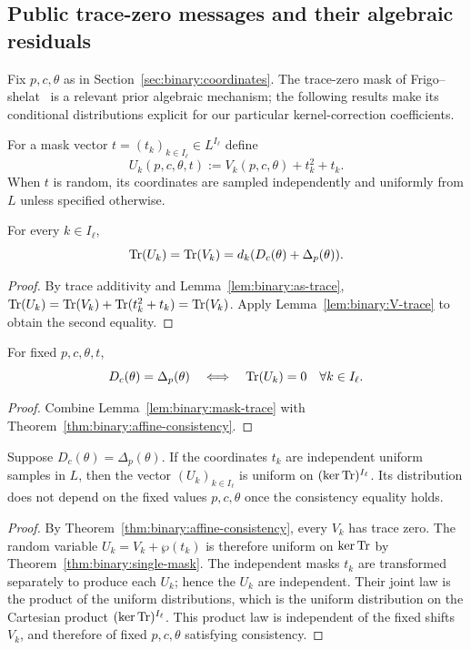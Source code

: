 \subsection{Public trace-zero messages and their algebraic residuals}\label{sec:binary:masked-traces}
Fix $p,c,\theta$ as in Section~\ref{sec:binary:coordinates}.
The trace-zero mask of Frigo--shelat~\cite{FrigoShelat2026}
is a relevant prior algebraic mechanism; the following results
make its conditional distributions explicit for our particular
kernel-correction coefficients.

\begin{definition}\label{def:binary:masked-values}
For a mask vector $t=(t_k)_{k\in I_\ell}\in L^{I_\ell}$
define
\[
 U_k(p,c,\theta,t)
   :=V_k(p,c,\theta)+t_k^2+t_k.
\]
When $t$ is random, its coordinates are sampled independently
and uniformly from $L$ unless specified otherwise.
\end{definition}

\begin{lemma}\label{lem:binary:mask-trace}
For every $k\in I_\ell$,
\[
 \operatorname{Tr}(U_k)=\operatorname{Tr}(V_k)
  =d_k(D_c(\theta)+\Delta_p(\theta)).
\]
\end{lemma}
\begin{proof}
By trace additivity and
Lemma~\ref{lem:binary:as-trace},
$\operatorname{Tr}(U_k)=\operatorname{Tr}(V_k)+\operatorname{Tr}(t_k^2+t_k)=\operatorname{Tr}(V_k)$.
Apply Lemma~\ref{lem:binary:V-trace} to obtain the
second equality.
\end{proof}

\begin{corollary}\label{cor:binary:masked-traces-consistent}
For fixed $p,c,\theta,t$,
\[
 D_c(\theta)=\Delta_p(\theta)
 \quad\Longleftrightarrow\quad
 \operatorname{Tr}(U_k)=0\quad\forall k\in I_\ell.
\]
\end{corollary}
\begin{proof}
Combine Lemma~\ref{lem:binary:mask-trace}
with Theorem~\ref{thm:binary:affine-consistency}.
\end{proof}

\begin{theorem}\label{thm:binary:masked-vector-uniform}
Suppose $D_c(\theta)=\Delta_p(\theta)$.
If the coordinates $t_k$ are independent uniform samples in $L$,
then the vector $(U_k)_{k\in I_\ell}$
is uniform on $(\ker\operatorname{Tr})^{I_\ell}$.
Its distribution does not depend on the fixed values $p,c,\theta$
once the consistency equality holds.
\end{theorem}
\begin{proof}
By Theorem~\ref{thm:binary:affine-consistency},
every $V_k$ has trace zero. The random variable
$U_k=V_k+\wp(t_k)$ is therefore uniform on $\ker\operatorname{Tr}$
by Theorem~\ref{thm:binary:single-mask}.
The independent masks $t_k$ are transformed separately
to produce each $U_k$; hence the $U_k$ are independent.
Their joint law is the product of the uniform distributions,
which is the uniform distribution on the Cartesian product
$(\ker\operatorname{Tr})^{I_\ell}$.
This product law is independent of the fixed shifts $V_k$,
and therefore of fixed $p,c,\theta$ satisfying consistency.
\end{proof}

